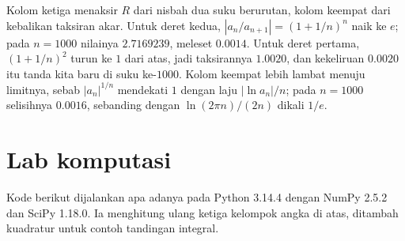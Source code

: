 Kolom ketiga menaksir $R$ dari nisbah dua suku berurutan, kolom keempat dari
kebalikan taksiran akar. Untuk deret kedua, $|a_n/a_{n+1}|=(1+1/n)^n$ naik ke
$e$; pada $n=1000$ nilainya $2.7169239$, meleset $0.0014$. Untuk deret pertama,
$(1+1/n)^2$ turun ke $1$ dari atas, jadi taksirannya $1.0020$, dan kekeliruan
$0.0020$ itu tanda kita baru di suku ke-$1000$. Kolom keempat lebih lambat menuju
limitnya, sebab $|a_n|^{1/n}$ mendekati $1$ dengan laju $|\ln a_n|/n$; pada
$n=1000$ selisihnya $0.0016$, sebanding dengan $\ln(2\pi n)/(2n)$ dikali $1/e$.


\section{Lab komputasi}

Kode berikut dijalankan apa adanya pada Python 3.14.4 dengan NumPy 2.5.2 dan
SciPy 1.18.0. Ia menghitung ulang ketiga kelompok angka di atas, ditambah
kuadratur untuk contoh tandingan integral.

